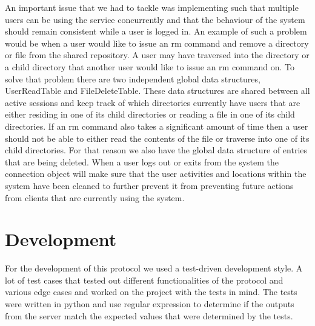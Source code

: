 \documentclass{article}
\begin{document}
An important issue that we had to tackle was implementing such that multiple users can be using the service concurrently and that the behaviour of the system
should remain consistent while a user is logged in. An example of such a problem would be when a user would like to issue an rm command and remove a directory
or file from the shared repository. A user may have traversed into the directory or a child directory that another user would like to issue an rm command on.
To solve that problem there are two independent global data structures, UserReadTable and FileDeleteTable. These data structures are shared between all active sessions and keep track
of which directories currently have users that are either residing in one of its child directories or reading a file in one of its child directories. If an rm command also
takes a significant amount of time then a user should not be able to either read the contents of the file or traverse into one of its child directories. For that reason we also have
the global data structure of entries that are being deleted. When a user logs out or exits from the system the connection object will make sure that the user activities and locations within the system have been cleaned
to further prevent it from preventing future actions from clients that are currently using the system.

\section{Development}

For the development of this protocol we used a test-driven development style. A lot of test cases that tested out different functionalities of the protocol and
various edge cases and worked on the project with the tests in mind. The tests were written in python and use regular expression to determine if the outputs from
the server match the expected values that were determined by the tests.
\end{document}

